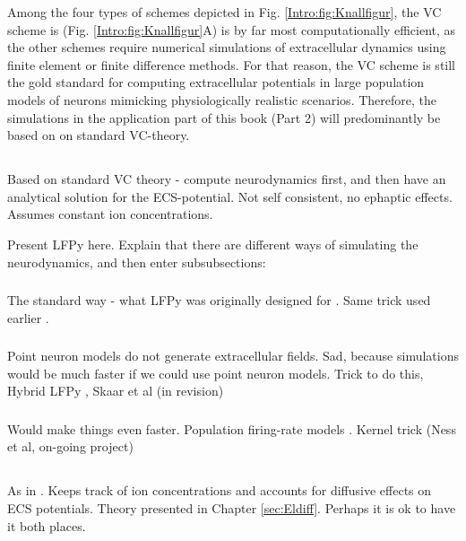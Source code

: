 Among the four types of schemes depicted in Fig. \ref{Intro:fig:Knallfigur}, the VC scheme is (Fig. \ref{Intro:fig:Knallfigur}A) is by far most computationally efficient, as the other schemes require numerical simulations of extracellular dynamics using finite element or finite difference methods. For that reason, the VC scheme is still the gold standard for computing extracellular potentials in large population models of neurons mimicking physiologically realistic scenarios. Therefore, the simulations in the application part of this book (Part 2) will predominantly be based on on standard VC-theory.

\subsection{}
Based on standard VC theory - compute neurodynamics first, and then have an analytical solution for the ECS-potential.
Not self consistent, no ephaptic effects. Assumes constant ion concentrations.

Present LFPy here. Explain that there are different ways of simulating the neurodynamics, and then enter subsubsections: 

\subsubsection{}
The standard way - what LFPy was originally designed for \cite{Hagen2018}.
Same trick used earlier \citep{Holt1999}.

\subsubsection{}
Point neuron models do not generate extracellular fields. Sad, because simulations would be much faster if we could use point neuron models. Trick to do this, Hybrid LFPy \citep{Hagen2016}, Skaar et al (in revision)

\subsubsection{}
Would make things even faster. Population firing-rate models  \citep{Hagen2016}. Kernel trick (Ness et al, on-going project) 


\subsection{}
As in \cite{Solbra2018}. Keeps track of ion concentrations and accounts for diffusive effects on ECS potentials. Theory presented in Chapter \ref{sec:Eldiff}. Perhaps it is ok to have it both places. 


